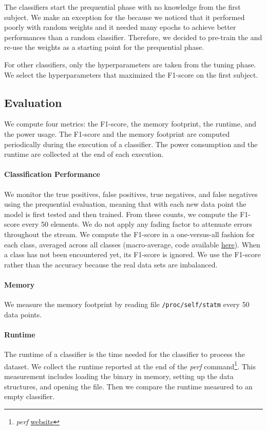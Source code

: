 The classifiers start the prequential phase with
no knowledge from the first subject.  We make an
exception for the \FNN because we noticed that it
performed poorly with random weights and it needed
many epochs to achieve better performances than a
random  classifier. Therefore, we decided to
pre-train the \FNN and re-use the weights as a
starting point for the prequential phase.

For other classifiers, only the 
hyperparameters are taken from the tuning phase.
We select the hyperparameters that 
maximized the F1-score on the first subject.


\subsection{Evaluation}
We compute four metrics: the F1-score, the memory
footprint, the runtime, and the power usage.
The F1-score and the memory
footprint are computed periodically during the
execution of a classifier. The
power consumption and the runtime are collected
at the end of each execution.

\paragraph{Classification Performance}
We monitor the true positives, false positives,
true negatives, and false negatives using the
prequential evaluation, meaning that with each new
data point the model is first tested and then
trained.  From these counts, we compute the
F1-score every 50 elements. We do not apply any
fading factor to attenuate errors throughout the
stream.  We compute the F1-score in a
one-versus-all fashion for each class, averaged
across all classes (macro-average, code available
\href{https://github.com/azazel7/paper-benchmark/blob/9adb1039c5a65a00a66d554f0e870d14d3fff7cb/main.cpp\#L82}{here}).
When a class has not been encountered yet, its
F1-score is ignored. We use the F1-score rather
than the accuracy because the real data sets are
imbalanced.

\paragraph{Memory}
We measure the memory footprint by reading file
\texttt{/proc/self/statm} every 50 data points.

\paragraph{Runtime}
The runtime of a classifier is the time needed for
the classifier to process the dataset. We
collect the runtime reported at the end of the \textit{perf}
command\footnote{\textit{perf}
\href{https://perf.wiki.kernel.org/index.php/Main_Page}{website}}. This measurement includes loading the
binary in memory, setting up the data structures,
and opening the file. Then we compare the runtime
measured to an empty classifier.

